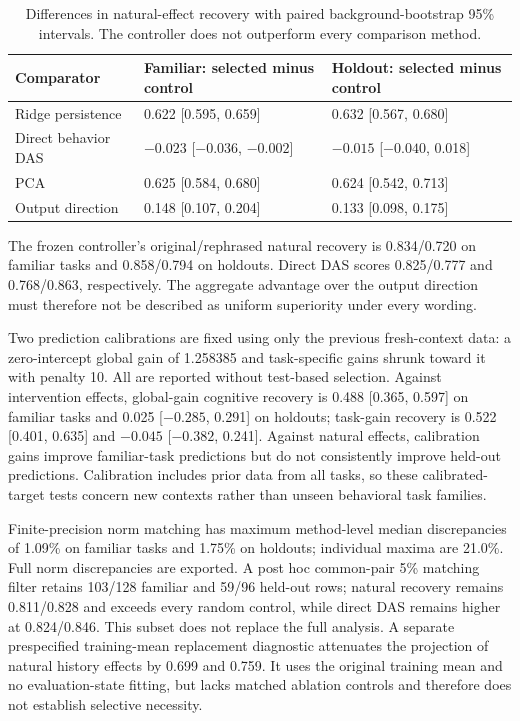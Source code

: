 \documentclass{article}
\begin{document}
\begin{table}[htbp]
\centering\small
\begin{tabular}{lll}
\toprule
Comparator & Familiar: selected minus control & Holdout: selected minus control \\
\midrule
Ridge persistence & 0.622 [0.595, 0.659] & 0.632 [0.567, 0.680] \\
Direct behavior DAS & $-0.023$ [$-0.036$, $-0.002$] & $-0.015$ [$-0.040$, 0.018] \\
PCA & 0.625 [0.584, 0.680] & 0.624 [0.542, 0.713] \\
Output direction & 0.148 [0.107, 0.204] & 0.133 [0.098, 0.175] \\
\bottomrule
\end{tabular}
\caption{Differences in natural-effect recovery with paired background-bootstrap 95\% intervals. The controller does not outperform every comparison method.}
\end{table}

The frozen controller's original/rephrased natural recovery is 0.834/0.720 on familiar tasks and 0.858/0.794 on holdouts. Direct DAS scores 0.825/0.777 and 0.768/0.863, respectively. The aggregate advantage over the output direction must therefore not be described as uniform superiority under every wording.

Two prediction calibrations are fixed using only the previous fresh-context data: a zero-intercept global gain of 1.258385 and task-specific gains shrunk toward it with penalty 10. All are reported without test-based selection. Against intervention effects, global-gain cognitive recovery is 0.488 [0.365, 0.597] on familiar tasks and 0.025 [$-0.285$, 0.291] on holdouts; task-gain recovery is 0.522 [0.401, 0.635] and $-0.045$ [$-0.382$, 0.241]. Against natural effects, calibration gains improve familiar-task predictions but do not consistently improve held-out predictions. Calibration includes prior data from all tasks, so these calibrated-target tests concern new contexts rather than unseen behavioral task families.

Finite-precision norm matching has maximum method-level median discrepancies of 1.09\% on familiar tasks and 1.75\% on holdouts; individual maxima are 21.0\%. Full norm discrepancies are exported. A post hoc common-pair 5\% matching filter retains 103/128 familiar and 59/96 held-out rows; natural recovery remains 0.811/0.828 and exceeds every random control, while direct DAS remains higher at 0.824/0.846. This subset does not replace the full analysis. A separate prespecified training-mean replacement diagnostic attenuates the projection of natural history effects by 0.699 and 0.759. It uses the original training mean and no evaluation-state fitting, but lacks matched ablation controls and therefore does not establish selective necessity.
\end{document}
